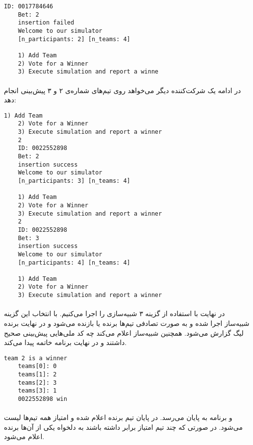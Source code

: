 \documentclass[../main.tex]{subfiles}
\begin{document}
\begin{latin}
\begin{lstlisting}[]
    ID: 0017784646
    Bet: 2
    insertion failed
    Welcome to our simulator
    [n_participants: 2] [n_teams: 4]

    1) Add Team
    2) Vote for a Winner
    3) Execute simulation and report a winne
\end{lstlisting}
\end{latin}

\paragraph{}
در ادامه یک شرکت‌کننده دیگر می‌خواهد روی تیم‌های شماره‌ی ۲ و ۳ پیش‌بینی انجام دهد:


\begin{latin}
\begin{lstlisting}[]
    1) Add Team
    2) Vote for a Winner
    3) Execute simulation and report a winner
    2
    ID: 0022552898
    Bet: 2
    insertion success
    Welcome to our simulator
    [n_participants: 3] [n_teams: 4]

    1) Add Team
    2) Vote for a Winner
    3) Execute simulation and report a winner
    2
    ID: 0022552898
    Bet: 3
    insertion success
    Welcome to our simulator
    [n_participants: 4] [n_teams: 4]

    1) Add Team
    2) Vote for a Winner
    3) Execute simulation and report a winner
\end{lstlisting}
\end{latin}

\paragraph{}
در نهایت با استفاده از گزینه ۳ شبیه‌سازی را اجرا می‌کنیم.
با انتخاب این گزینه شبیه‌ساز اجرا شده و به صورت تصادفی تیم‌ها برنده یا بازنده می‌شود
و در نهایت برنده لیگ گزارش می‌شود. همچنین شبیه‌ساز اعلام می‌کند چه کد ملی‌هایی پیش‌بینی صحیح داشتند
و در نهایت برنامه خاتمه پیدا می‌کند.

\begin{latin}
\begin{lstlisting}[]
    team 2 is a winner
    teams[0]: 0
    teams[1]: 2
    teams[2]: 3
    teams[3]: 1
    0022552898 win
\end{lstlisting}
\end{latin}

\paragraph{}
و برنامه به پایان می‌رسد. در پایان تیم برنده اعلام شده و امتیاز همه تیم‌ها لیست می‌شود. در صورتی که چند تیم امتیاز برابر داشته باشند به دلخواه یکی از آن‌ها برنده اعلام می‌شود.
\end{document}
